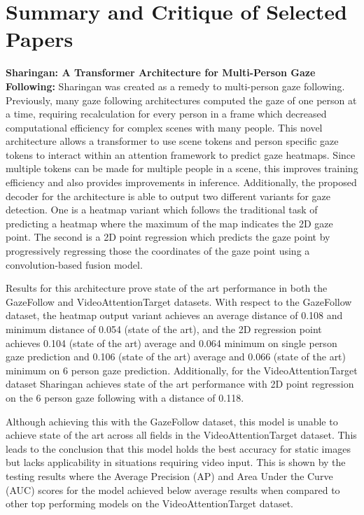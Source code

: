 \documentclass{article}
\theoremstyle{plain}
\theoremstyle{definition}
\theoremstyle{remark}
\begin{document}
\section*{Summary and Critique of Selected Papers}
\textbf{Sharingan: A Transformer Architecture for Multi-Person Gaze Following:}
Sharingan was created as a remedy to multi-person gaze following. Previously, many gaze following architectures computed the gaze of one person at a time, requiring recalculation for every person in a frame which decreased computational efficiency for complex scenes with many people. This novel architecture allows a transformer to use scene tokens and person specific gaze tokens to interact within an attention framework to predict gaze heatmaps. Since multiple tokens can be made for multiple people in a scene, this improves training efficiency and also provides improvements in inference. Additionally, the proposed decoder for the architecture is able to output two different variants for gaze detection. One is a heatmap variant which follows the traditional task of predicting a heatmap where the maximum of the map indicates the 2D gaze point. The second is a 2D point regression which predicts the gaze point by progressively regressing those the coordinates of the gaze point using a convolution-based fusion model.

\hspace{20pt} Results for this architecture prove state of the art performance in both the GazeFollow and VideoAttentionTarget datasets. With respect to the GazeFollow dataset, the heatmap output variant achieves an average distance of 0.108 and minimum distance of 0.054 (state of the art), and the 2D regression point achieves 0.104 (state of the art) average and 0.064 minimum on single person gaze prediction and 0.106 (state of the art) average and 0.066 (state of the art) minimum on 6 person gaze prediction. Additionally, for the VideoAttentionTarget dataset Sharingan achieves state of the art performance with 2D point regression on the 6 person gaze following with a distance of 0.118.

\hspace{20pt} Although achieving this with the GazeFollow dataset, this model is unable to achieve state of the art across all fields in the VideoAttentionTarget dataset. This leads to the conclusion that this model holds the best accuracy for static images but lacks applicability in situations requiring video input. This is shown by the testing results where the Average Precision (AP) and Area Under the Curve (AUC) scores for the model achieved below average results when compared to other top performing models on the VideoAttentionTarget dataset.
\end{document}
